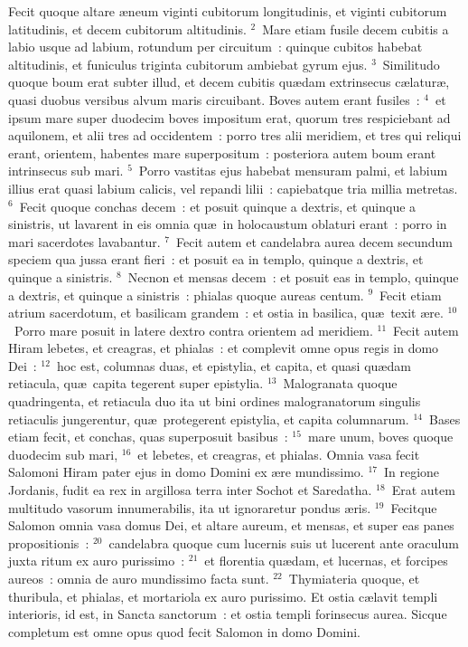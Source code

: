 \lettrine[lines=10,image=true,loversize=0.05,lraise=-0.03]{F}{}ecit quoque altare \ae neum viginti cubitorum longitudinis, et viginti cubitorum latitudinis, et decem cubitorum altitudinis.
${}^{2}$~Mare etiam fusile decem cubitis a labio usque ad labium, rotundum per circuitum~: quinque cubitos habebat altitudinis, et funiculus triginta cubitorum ambiebat gyrum ejus.
${}^{3}$~Similitudo quoque boum erat subter illud, et decem cubitis qu\ae dam extrinsecus c\ae latur\ae , quasi duobus versibus alvum maris circuibant. Boves autem erant fusiles~:
${}^{4}$~et ipsum mare super duodecim boves impositum erat, quorum tres respiciebant ad aquilonem, et alii tres ad occidentem~: porro tres alii meridiem, et tres qui reliqui erant, orientem, habentes mare superpositum~: posteriora autem boum erant intrinsecus sub mari.
${}^{5}$~Porro vastitas ejus habebat mensuram palmi, et labium illius erat quasi labium calicis, vel repandi lilii~: capiebatque tria millia metretas.
${}^{6}$~Fecit quoque conchas decem~: et posuit quinque a dextris, et quinque a sinistris, ut lavarent in eis omnia qu\ae\ in holocaustum oblaturi erant~: porro in mari sacerdotes lavabantur.
${}^{7}$~Fecit autem et candelabra aurea decem secundum speciem qua jussa erant fieri~: et posuit ea in templo, quinque a dextris, et quinque a sinistris.
${}^{8}$~Necnon et mensas decem~: et posuit eas in templo, quinque a dextris, et quinque a sinistris~: phialas quoque aureas centum.
${}^{9}$~Fecit etiam atrium sacerdotum, et basilicam grandem~: et ostia in basilica, qu\ae\ texit \ae re.
${}^{10}$~Porro mare posuit in latere dextro contra orientem ad meridiem.
${}^{11}$~Fecit autem Hiram lebetes, et creagras, et phialas~: et complevit omne opus regis in domo Dei~:
${}^{12}$~hoc est, columnas duas, et epistylia, et capita, et quasi qu\ae dam retiacula, qu\ae\ capita tegerent super epistylia.
${}^{13}$~Malogranata quoque quadringenta, et retiacula duo ita ut bini ordines malogranatorum singulis retiaculis jungerentur, qu\ae\ protegerent epistylia, et capita columnarum.
${}^{14}$~Bases etiam fecit, et conchas, quas superposuit basibus~:
${}^{15}$~mare unum, boves quoque duodecim sub mari,
${}^{16}$~et lebetes, et creagras, et phialas. Omnia vasa fecit Salomoni Hiram pater ejus in domo Domini ex \ae re mundissimo.
${}^{17}$~In regione Jordanis, fudit ea rex in argillosa terra inter Sochot et Saredatha.
${}^{18}$~Erat autem multitudo vasorum innumerabilis, ita ut ignoraretur pondus \ae ris.
${}^{19}$~Fecitque Salomon omnia vasa domus Dei, et altare aureum, et mensas, et super eas panes propositionis~:
${}^{20}$~candelabra quoque cum lucernis suis ut lucerent ante oraculum juxta ritum ex auro purissimo~:
${}^{21}$~et florentia qu\ae dam, et lucernas, et forcipes aureos~: omnia de auro mundissimo facta sunt.
${}^{22}$~Thymiateria quoque, et thuribula, et phialas, et mortariola ex auro purissimo. Et ostia c\ae lavit templi interioris, id est, in Sancta sanctorum~: et ostia templi forinsecus aurea. Sicque completum est omne opus quod fecit Salomon in domo Domini.

